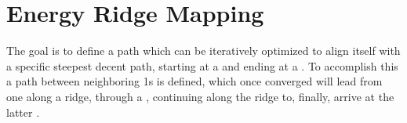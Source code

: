 \section{Energy Ridge Mapping}
The goal is to define a path which can be iteratively optimized to align itself with a specific steepest decent path,
starting at a  and ending at a .
To accomplish this a path between neighboring \sap1s is defined,
which once converged will lead from one  along a ridge,
through a ,
continuing along the ridge to, finally, arrive at the latter .


\incomplete
